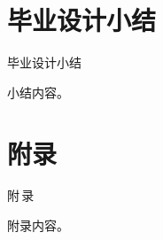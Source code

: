 \documentclass{nwputhesis}
\begin{document}
\section*{毕业设计小结}
\makespace
\begin{center}
    { \blackti \fontsize{16.0600pt}{1.25}毕业设计小结}
\end{center}
小结内容。

\makespace
\section*{附录}
\begin{center}
    { \blackti \fontsize{16.0600pt}{1.25}附\,录}
\end{center}
附录内容。
\end{document}
